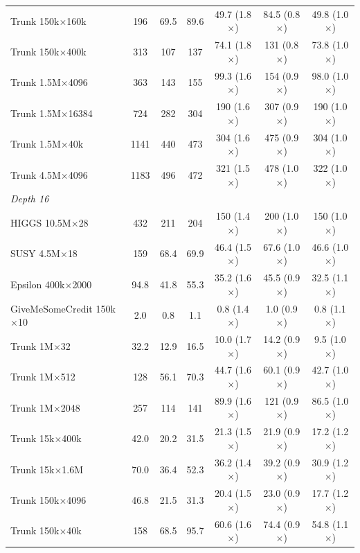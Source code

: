 \begin{table}[p]
\begin{tabular}{l|ccc|ccc}
        Trunk 150k$\times$160k & 196 & 69.5 & 89.6 & 49.7 (1.8$\times$) & 84.5 (0.8$\times$) & 49.8 (1.0$\times$) \\
        Trunk 150k$\times$400k & 313 & 107 & 137 & 74.1 (1.8$\times$) & 131 (0.8$\times$) & 73.8 (1.0$\times$) \\
        Trunk 1.5M$\times$4096 & 363 & 143 & 155 & 99.3 (1.6$\times$) & 154 (0.9$\times$) & 98.0 (1.0$\times$) \\
        Trunk 1.5M$\times$16384 & 724 & 282 & 304 & 190 (1.6$\times$) & 307 (0.9$\times$) & 190 (1.0$\times$) \\
        Trunk 1.5M$\times$40k & 1141 & 440 & 473 & 304 (1.6$\times$) & 475 (0.9$\times$) & 304 (1.0$\times$) \\
        Trunk 4.5M$\times$4096 & 1183 & 496 & 472 & 321 (1.5$\times$) & 478 (1.0$\times$) & 322 (1.0$\times$) \\
        \hline
        \multicolumn{7}{l}{\textit{Depth 16}} \\
        HIGGS 10.5M$\times$28 & 432 & 211 & 204 & 150 (1.4$\times$) & 200 (1.0$\times$) & 150 (1.0$\times$) \\
        SUSY 4.5M$\times$18 & 159 & 68.4 & 69.9 & 46.4 (1.5$\times$) & 67.6 (1.0$\times$) & 46.6 (1.0$\times$) \\
        Epsilon 400k$\times$2000 & 94.8 & 41.8 & 55.3 & 35.2 (1.6$\times$) & 45.5 (0.9$\times$) & 32.5 (1.1$\times$) \\
        GiveMeSomeCredit 150k$\times$10 & 2.0 & 0.8 & 1.1 & 0.8 (1.4$\times$) & 1.0 (0.9$\times$) & 0.8 (1.1$\times$) \\
        Trunk 1M$\times$32 & 32.2 & 12.9 & 16.5 & 10.0 (1.7$\times$) & 14.2 (0.9$\times$) & 9.5 (1.0$\times$) \\
        Trunk 1M$\times$512 & 128 & 56.1 & 70.3 & 44.7 (1.6$\times$) & 60.1 (0.9$\times$) & 42.7 (1.0$\times$) \\
        Trunk 1M$\times$2048 & 257 & 114 & 141 & 89.9 (1.6$\times$) & 121 (0.9$\times$) & 86.5 (1.0$\times$) \\
        Trunk 15k$\times$400k & 42.0 & 20.2 & 31.5 & 21.3 (1.5$\times$) & 21.9 (0.9$\times$) & 17.2 (1.2$\times$) \\
        Trunk 15k$\times$1.6M & 70.0 & 36.4 & 52.3 & 36.2 (1.4$\times$) & 39.2 (0.9$\times$) & 30.9 (1.2$\times$) \\
        Trunk 150k$\times$4096 & 46.8 & 21.5 & 31.3 & 20.4 (1.5$\times$) & 23.0 (0.9$\times$) & 17.7 (1.2$\times$) \\
        Trunk 150k$\times$40k & 158 & 68.5 & 95.7 & 60.6 (1.6$\times$) & 74.4 (0.9$\times$) & 54.8 (1.1$\times$) \\

\end{tabular}
\end{table}
